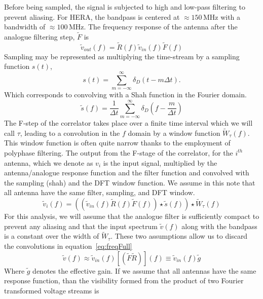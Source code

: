 \documentclass[useAMS,usenatbib]{mn2e}
\begin{document}
Before being sampled, the signal is subjected to high and low-pass filtering to prevent aliasing. For HERA, the bandpass is centered at $\approx 150$\,MHz with a bandwidth of $\approx 100$\,MHz. The frequency response of the antenna after the analogue filtering step, $\widetilde{F}$ is 
\begin{equation}
\widetilde{v}_{out}(f) = \widetilde{R}(f) \widetilde{v}_{in}(f) \widetilde{F}(f)
\end{equation}
Sampling may be represented as multiplying the time-stream by a sampling function $s(t)$, 
\begin{equation}
s(t) = \sum_{m=-\infty}^{\infty} \delta_D(t-m \Delta t).
\end{equation}
Which corresponds to convolving with a Shah function in the Fourier domain. 
\begin{equation}
\widetilde{s}(f) =  \frac{1}{\Delta t} \sum_{m=-\infty}^{\infty} \delta_D \left(f - \frac{m}{\Delta t} \right)
\end{equation}
The F-step of the correlator takes place over a finite time interval which we will call $\tau$, leading to a convolution in the $f$ domain by a window function $\widetilde{W}_\tau(f)$. This window function is often quite narrow thanks to the employment of polyphase filtering. The output from the F-stage of the correlator, for the $i^{th}$ antenna, which we denote as $v_i$ is the input signal, multiplied by the antenna/analogue response function and the filter function and convolved with the sampling (shah) and the DFT window function. We assume in this note that all antenna have the same filter, sampling, and DFT window. 
\begin{equation}\label{eq:freqFull}
\widetilde{v}_i(f) = (( \widetilde{v}_{in}(f) \widetilde{R}(f) \widetilde{F}(f) ) \star \widetilde{s}(f) ) \star \widetilde{W}_\tau(f)
\end{equation}
For this analysis, we will assume that the analogue filter is sufficiently compact to prevent any aliasing and that the input spectrum $\widetilde{v}(f)$ along with the bandpass  is a constant over the width of $\widetilde{W}_\tau$. These two assumptions allow us to discard the convolutions in equation~\ref{eq:freqFull}
\begin{equation}
\widetilde{v}(f) \approx \widetilde{v}_{in}(f) \left[ \left( \widetilde{F} \widetilde{R} \right) \right](f) \equiv \widetilde{v}_{in}(f) \widetilde{g}
\end{equation}
Where $\widetilde{g}$ denotes the effective gain. If we assume that all antennas have the same response function, than the visibility formed from the product of two Fourier transformed voltage streams is
\end{document}

